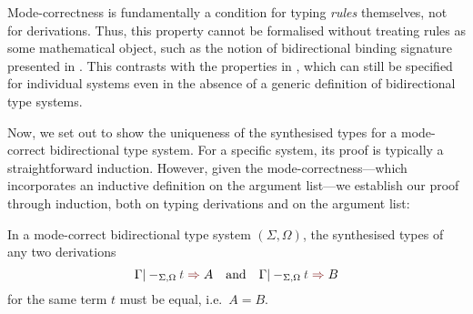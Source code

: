 \begin{remark}
  Mode-correctness is fundamentally a condition for typing \emph{rules} themselves, not for derivations.
  Thus, this property cannot be formalised without treating rules as some mathematical object, such as the notion of bidirectional binding signature presented in .
  This contrasts with the properties in , which can still be specified for individual systems even in the absence of a generic definition of bidirectional type systems.
\end{remark}

Now, we set out to show the uniqueness of the synthesised types for a mode-correct bidirectional type system.
For a specific system, its proof is typically a straightforward induction.
However, given the mode-correctness---which incorporates an inductive definition on the argument list---we establish our proof through induction, both on typing derivations and on the argument list:
\begin{lemma}\label{thm:unique-syn}
  In a mode-correct bidirectional type system $(\Sigma, \Omega)$, the synthesised types of any two derivations
  \[
    \Gamma |-_{\Sigma, \Omega} \isTerm{t} \syn A
    \quad\text{and}\quad
    \Gamma |-_{\Sigma, \Omega} \isTerm{t} \syn B
  \]
  for the same term $t$ must be equal, i.e.\ $A = B$.
\end{lemma}
